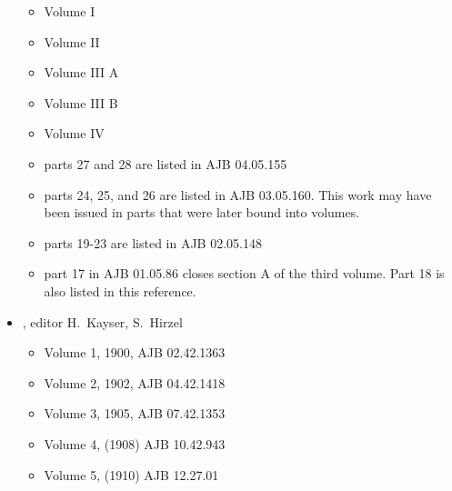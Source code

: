 \begin{itemize}
    \begin{itemize}
      \item Volume I
      \item Volume II
      \item Volume III A
      \item Volume III B
      \item Volume IV
      \item parts 27 and 28 are listed in AJB 04.05.155
      \item parts 24, 25, and 26 are listed in AJB 03.05.160. This
        work may have been issued in parts that were later bound into
        volumes.
      \item parts 19-23 are listed in AJB 02.05.148
      \item part 17 in AJB 01.05.86 closes section A of the
        third volume. Part 18 is also listed in this reference.
    \end{itemize}
  
\item {}, editor H.~Kayser, S.~Hirzel
  \begin{itemize}
  \item Volume 1, 1900, AJB 02.42.1363
  \item Volume 2, 1902, AJB 04.42.1418
  \item Volume 3, 1905, AJB 07.42.1353
  \item Volume 4, (1908) AJB 10.42.943
  \item Volume 5, (1910) AJB 12.27.01
  \end{itemize}
  

\end{itemize}
